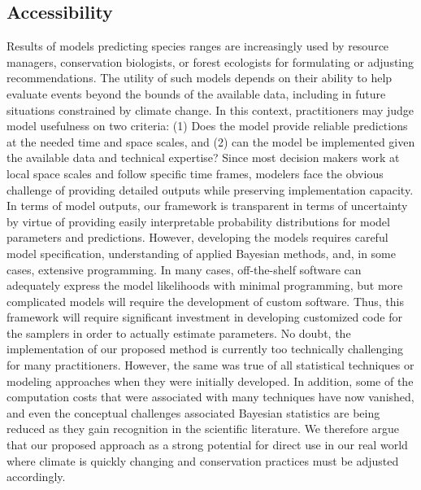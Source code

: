 \subsection*{Accessibility}
Results of models predicting species ranges are increasingly used by resource managers, conservation biologists, or forest ecologists for formulating or adjusting recommendations. 
The utility of such models depends on their ability to help evaluate events beyond the bounds of the available data, including in future situations constrained by climate change. 
In this context, practitioners may judge model usefulness on two criteria: (1) Does the model provide reliable predictions at the needed time and space scales, and (2) can the model be implemented given the available data and technical expertise? 
Since most decision makers work at local space scales and follow specific time frames, modelers face the obvious challenge of providing detailed outputs while preserving implementation capacity.
In terms of model outputs, our framework is transparent in terms of uncertainty by virtue of providing easily interpretable probability distributions for model parameters and predictions.
However, developing the models requires careful model specification, understanding of applied Bayesian methods, and, in some cases, extensive programming.
In many cases, off-the-shelf software \citep[e.g.,][]{R, RJAGS} can adequately express the model likelihoods with minimal programming, but more complicated models will require the development of custom software.
Thus, this framework will require significant investment in developing customized code for the samplers in order to actually estimate parameters.
No doubt, the implementation of our proposed method is currently too technically challenging for many practitioners. 
However, the same was true of all statistical techniques or modeling approaches when they were initially developed. 
In addition, some of the computation costs that were associated with many techniques have now vanished, and even the conceptual challenges associated Bayesian statistics are being reduced as they gain recognition in the scientific literature. 
We therefore argue that our proposed approach as a strong potential for direct use in our real world where climate is quickly changing and conservation practices must be adjusted accordingly.

